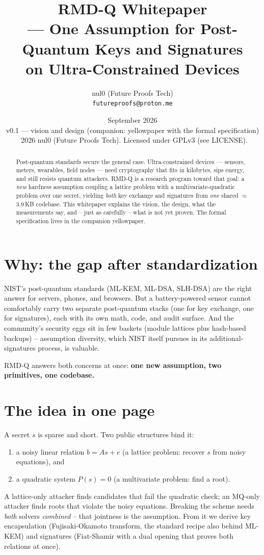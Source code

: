\documentclass[11pt,a4paper]{article}
\title{RMD-Q Whitepaper\\--- One Assumption for Post-Quantum Keys and Signatures\\on Ultra-Constrained Devices}
\author{nul0 (Future Proofs Tech) \\ \texttt{futureproofs@proton.me}}
\date{September 2026 \\ v0.1 --- vision and design (companion: yellowpaper with the formal specification) \\
\small \textcopyright\ 2026 nul0 (Future Proofs Tech). Licensed under GPLv3 (see LICENSE).}
\begin{document}
\maketitle

\begin{abstract}
Post-quantum standards secure the general case. Ultra-constrained devices
--- sensors, meters, wearables, field nodes --- need cryptography that fits
in kilobytes, sips energy, and still resists quantum attackers. RMD-Q is a
research program toward that goal: a \emph{new} hardness assumption coupling
a lattice problem with a multivariate-quadratic problem over one secret,
yielding \emph{both} key exchange and signatures from \emph{one} shared
$\approx$3.9\,KB codebase. This whitepaper explains the vision, the design,
what the measurements say, and -- just as carefully -- what is not yet
proven. The formal specification lives in the companion yellowpaper.
\end{abstract}

\tableofcontents
\newpage

\section{Why: the gap after standardization}

NIST's post-quantum standards (ML-KEM, ML-DSA, SLH-DSA) are the right
answer for servers, phones, and browsers. But a battery-powered sensor
cannot comfortably carry two separate post-quantum stacks (one for key
exchange, one for signatures), each with its own math, code, and audit
surface. And the community's security eggs sit in few baskets
(module lattices plus hash-based backups) -- assumption diversity, which
NIST itself pursues in its additional-signatures process, is valuable.

RMD-Q answers both concerns at once: \textbf{one new assumption, two
primitives, one codebase.}

\section{The idea in one page}

A secret $s$ is sparse and short. Two public structures bind it:
\begin{enumerate}
\item a noisy linear relation $b = As+e$ (a lattice problem: recover $s$
  from noisy equations), and
\item a quadratic system $P(s)=0$ (a multivariate problem: find a root).
\end{enumerate}
A lattice-only attacker finds candidates that fail the quadratic check;
an MQ-only attacker finds roots that violate the noisy equations. Breaking
the scheme needs \emph{both} solvers \emph{combined} -- that jointness is
the assumption. From it we derive key encapsulation (Fujisaki-Okamoto
transform, the standard recipe also behind ML-KEM) and signatures
(Fiat-Shamir with a dual opening that proves both relations at once).
\end{document}
